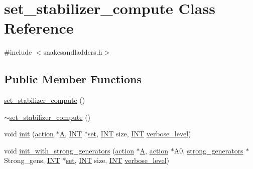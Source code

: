 \hypertarget{classset__stabilizer__compute}{}\section{set\+\_\+stabilizer\+\_\+compute Class Reference}
\label{classset__stabilizer__compute}


{\ttfamily \#include $<$snakesandladders.\+h$>$}

\subsection*{Public Member Functions}
\begin{DoxyCompactItemize}
\item 
\mbox{\hyperlink{classset__stabilizer__compute_a92626effc4df71a9244bc786d7cd3fef}{set\+\_\+stabilizer\+\_\+compute}} ()
\item 
\mbox{\hyperlink{classset__stabilizer__compute_a8ff0d758abfdb9605d9c59e003bc46b9}{$\sim$set\+\_\+stabilizer\+\_\+compute}} ()
\item 
void \mbox{\hyperlink{classset__stabilizer__compute_a3ffab71fb628fd1c25694c1bb69a65fe}{init}} (\mbox{\hyperlink{classaction}{action}} $\ast$\mbox{\hyperlink{classset__stabilizer__compute_a2d64c5c51d63999c9904b79b8d5dd7bf}{A}}, \mbox{\hyperlink{galois_8h_a09fddde158a3a20bd2dcadb609de11dc}{I\+NT}} $\ast$\mbox{\hyperlink{nauty_8h_a9690bea211101f22a5e154087590c3da}{set}}, \mbox{\hyperlink{galois_8h_a09fddde158a3a20bd2dcadb609de11dc}{I\+NT}} size, \mbox{\hyperlink{galois_8h_a09fddde158a3a20bd2dcadb609de11dc}{I\+NT}} \mbox{\hyperlink{simeon_8_c_a818073fbcc2f439e7c56952f67386122}{verbose\+\_\+level}})
\item 
void \mbox{\hyperlink{classset__stabilizer__compute_ad6def8c34e1eba080f0383038cd76016}{init\+\_\+with\+\_\+strong\+\_\+generators}} (\mbox{\hyperlink{classaction}{action}} $\ast$\mbox{\hyperlink{classset__stabilizer__compute_a2d64c5c51d63999c9904b79b8d5dd7bf}{A}}, \mbox{\hyperlink{classaction}{action}} $\ast$A0, \mbox{\hyperlink{classstrong__generators}{strong\+\_\+generators}} $\ast$Strong\+\_\+gens, \mbox{\hyperlink{galois_8h_a09fddde158a3a20bd2dcadb609de11dc}{I\+NT}} $\ast$\mbox{\hyperlink{nauty_8h_a9690bea211101f22a5e154087590c3da}{set}}, \mbox{\hyperlink{galois_8h_a09fddde158a3a20bd2dcadb609de11dc}{I\+NT}} size, \mbox{\hyperlink{galois_8h_a09fddde158a3a20bd2dcadb609de11dc}{I\+NT}} \mbox{\hyperlink{simeon_8_c_a818073fbcc2f439e7c56952f67386122}{verbose\+\_\+level}})
\item 

\end{DoxyCompactItemize}
